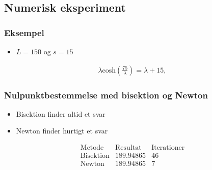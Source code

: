 \subsection{Numerisk eksperiment}
\begin{frame}
\frametitle{Eksempel}
\begin{itemize}
\item $L=150$ og $s=15$
\end{itemize}
\begin{align*}
\lambda \text{cosh}\left( \frac{75}{\lambda} \right) = \lambda + 15,
\end{align*} 
\end{frame}
\begin{frame}
\frametitle{Nulpunktbestemmelse med \phantom{Heeekjjjjeej} bisektion og Newton}
\begin{itemize}
\item Bisektion finder altid et svar
\item Newton finder hurtigt et svar
\end{itemize}

$$\begin{array}{l|c|c}
\text{Metode} & \text{Resultat} & \text{Iterationer}\\
\hline
\text{Bisektion}	& 189.94865 & 46\\
\text{Newton}		& 189.94865 & 7\\
\end{array}$$

\end{frame}
